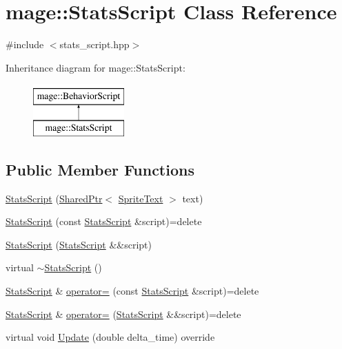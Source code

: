 \hypertarget{classmage_1_1_stats_script}{}\section{mage\+:\+:Stats\+Script Class Reference}
\label{classmage_1_1_stats_script}


{\ttfamily \#include $<$stats\+\_\+script.\+hpp$>$}

Inheritance diagram for mage\+:\+:Stats\+Script\+:\begin{figure}[H]
\begin{center}
\leavevmode
\includegraphics[height=2.000000cm]{classmage_1_1_stats_script}
\end{center}
\end{figure}
\subsection*{Public Member Functions}
\begin{DoxyCompactItemize}
\item 
\hyperlink{classmage_1_1_stats_script_a5d2042950a17b62004adead100eb07e1}{Stats\+Script} (\hyperlink{namespacemage_a1e01ae66713838a7a67d30e44c67703e}{Shared\+Ptr}$<$ \hyperlink{classmage_1_1_sprite_text}{Sprite\+Text} $>$ text)
\item 
\hyperlink{classmage_1_1_stats_script_aab237b7c391d7ca7ad96cfa33a3aac81}{Stats\+Script} (const \hyperlink{classmage_1_1_stats_script}{Stats\+Script} \&script)=delete
\item 
\hyperlink{classmage_1_1_stats_script_af511d7e2e6bec30cd05782de94c65abe}{Stats\+Script} (\hyperlink{classmage_1_1_stats_script}{Stats\+Script} \&\&script)
\item 
virtual \hyperlink{classmage_1_1_stats_script_a65ba91e19c78c99831a65ad6dd6bb149}{$\sim$\+Stats\+Script} ()
\item 
\hyperlink{classmage_1_1_stats_script}{Stats\+Script} \& \hyperlink{classmage_1_1_stats_script_a7da39f1c0cc417dabdc539f49deec7c3}{operator=} (const \hyperlink{classmage_1_1_stats_script}{Stats\+Script} \&script)=delete
\item 
\hyperlink{classmage_1_1_stats_script}{Stats\+Script} \& \hyperlink{classmage_1_1_stats_script_a6adacd651debb83254e1121f32c8f21e}{operator=} (\hyperlink{classmage_1_1_stats_script}{Stats\+Script} \&\&script)=delete
\item 
virtual void \hyperlink{classmage_1_1_stats_script_abb2f4de15b51b72e54dc893ecd947fad}{Update} (double delta\+\_\+time) override
\end{DoxyCompactItemize}
